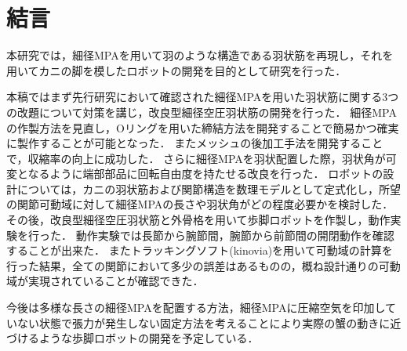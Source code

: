 \newpage
\section{結言}
本研究では，細径MPAを用いて羽のような構造である羽状筋を再現し，それを用いてカニの脚を模したロボットの開発を目的として研究を行った．


本稿ではまず先行研究において確認された細径MPAを用いた羽状筋に関する3つの改題について対策を講じ，改良型細径空圧羽状筋の開発を行った．
細径MPAの作製方法を見直し，Oリングを用いた締結方法を開発することで簡易かつ確実に製作することが可能となった．
またメッシュの後加工手法を開発することで，収縮率の向上に成功した．
さらに細径MPAを羽状配置した際，羽状角が可変となるように端部部品に回転自由度を持たせる改良を行った．
ロボットの設計については，カニの羽状筋および関節構造を数理モデルとして定式化し，所望の関節可動域に対して細径MPAの長さや羽状角がどの程度必要かを検討した．
その後，改良型細径空圧羽状筋と外骨格を用いて歩脚ロボットを作製し，動作実験を行った．
動作実験では長節から腕節間，腕節から前節間の開閉動作を確認することが出来た．
またトラッキングソフト(kinovia)を用いて可動域の計算を行った結果，全ての関節において多少の誤差はあるものの，概ね設計通りの可動域が実現されていることが確認できた．


今後は多様な長さの細径MPAを配置する方法，細径MPAに圧縮空気を印加していない状態で張力が発生しない固定方法を考えることにより実際の蟹の動きに近づけるような歩脚ロボットの開発を予定している．